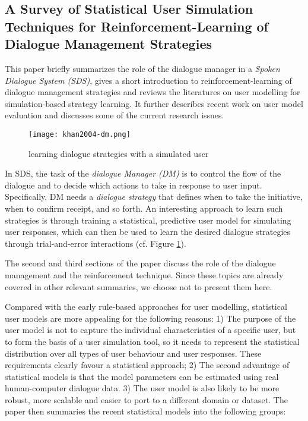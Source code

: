 \subsection{A Survey of Statistical User Simulation Techniques for Reinforcement-Learning of Dialogue Management Strategies \cite{Schatzmann2006}}

This paper briefly summarizes the role of the dialogue manager in a \emph{Spoken Dialogue System (SDS)}, gives a short introduction to reinforcement-learning of dialogue management strategies and reviews the literatures on user modelling for simulation-based strategy learning. It further describes recent work on user model evaluation and discusses some of the current research issues.
\begin{figure}[h]
  \centering
  \texttt{[image: khan2004-dm.png]}\\
  \caption{learning dialogue strategies with a simulated user}\label{fig:khan04-dm}
\end{figure}

In SDS, the task of the \emph{dialogue Manager (DM)} is to control the flow of the dialogue and to decide which actions to take in response to user input. Specifically, DM needs a \emph{dialogue strategy} that defines when to take the initiative, when to confirm receipt, and so forth. An interesting approach to learn such strategies is through training a statistical, predictive user model for simulating user responses, which can then be used to learn the desired dialogue strategies through trial-and-error interactions (cf. Figure \ref{fig:khan04-dm}).

The second and third sections of the paper discuss  the role of the dialogue management and the reinforcement technique. Since these topics are already covered in other relevant summaries, we choose not to present them here.

Compared with the early rule-based approaches for user modelling, statistical user models are more appealing for the following reasons: 1) The purpose of the user model is not to capture the individual characteristics of a specific user, but to form the basis of a user simulation tool, so it needs to represent the statistical distribution over all types of user behaviour and user responses. These requirements clearly favour a statistical approach; 2) The second advantage of statistical models is that the model parameters can be estimated using real human-computer dialogue data. 3) The user model is also likely to be more robust, more scalable and easier to port to a different domain or dataset. The paper then summaries the recent statistical models into the following groups:

